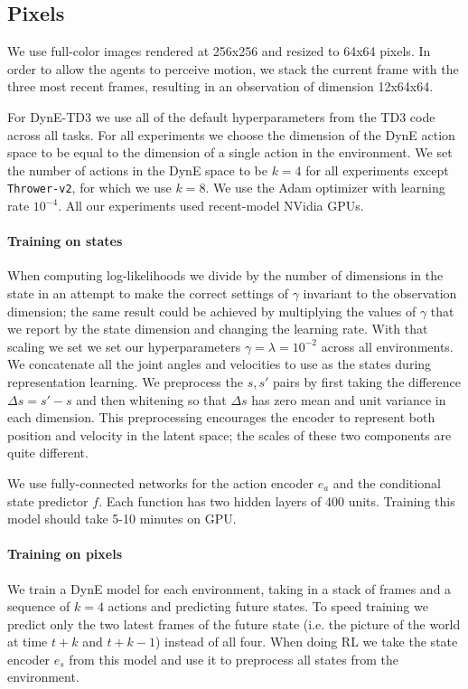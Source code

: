 \subsection{Pixels}
We use full-color images rendered at 256x256 and resized to 64x64 pixels.
In order to allow the agents to perceive motion, we stack the current frame with the three most recent frames, resulting in an observation of dimension 12x64x64.


 \label{sec:hyperparams}

For DynE-TD3 we use all of the default hyperparameters from the TD3 code across all tasks.
For all experiments we choose the dimension of the DynE action space to be equal to the dimension of a single action in the environment.
We set the number of actions in the DynE space to be $k=4$ for all experiments except \texttt{Thrower-v2}, for which we use $k=8$.
We use the Adam optimizer \citep{kingma2014adam} with learning rate $10^{-4}$.
All our experiments used recent-model NVidia GPUs.


\paragraph{Training on states}
When computing log-likelihoods we divide by the number of dimensions in the state in an attempt to make the correct settings of $\gamma$ invariant to the observation dimension; the same result could be achieved by multiplying the values of $\gamma$ that we report by the state dimension and changing the learning rate.
With that scaling we set we set our hyperparameters $\gamma = \lambda = 10^{-2}$ across all environments.
We concatenate all the joint angles and velocities to use as the states during representation learning.
We preprocess the $s, s'$ pairs by first taking the difference $\Delta s = s' - s$ and then whitening so that $\Delta s$ has zero mean and unit variance in each dimension.
This preprocessing encourages the encoder to represent both position and velocity in the latent space; the scales of these two components are quite different.

We use fully-connected networks for the action encoder $e_a$ and the conditional state predictor $f$. Each function has two hidden layers of 400 units.
Training this model should take 5-10 minutes on GPU.


\paragraph{Training on pixels}
We train a DynE model for each environment, taking in a stack of frames and a sequence of $k=4$ actions and predicting future states.
To speed training we predict only the two latest frames of the future state (i.e. the picture of the world at time $t+k$ and $t+k-1$) instead of all four.
When doing RL we take the state encoder $e_s$ from this model and use it to preprocess all states from the environment.

